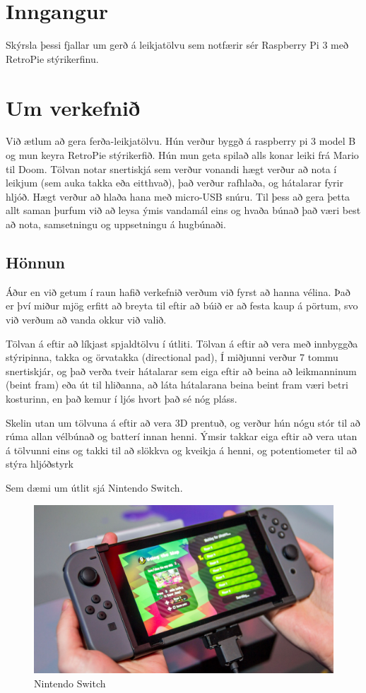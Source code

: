 \section{Inngangur}
Skýrsla þessi fjallar um gerð á leikjatölvu sem notfærir sér Raspberry Pi 3 með RetroPie stýrikerfinu.

\section{Um verkefnið}
Við ætlum að gera ferða-leikjatölvu. Hún verður byggð á raspberry pi 3 model B og mun keyra RetroPie stýrikerfið. Hún mun geta spilað alls konar leiki frá Mario til Doom. Tölvan notar snertiskjá sem verður vonandi hægt verður að nota í leikjum (sem auka takka eða eitthvað), það verður rafhlaða, og hátalarar fyrir hljóð. Hægt verður að hlaða hana með micro-USB snúru. Til þess að gera þetta allt saman þurfum við að leysa ýmis vandamál eins og hvaða búnað það væri best að nota, samsetningu og uppsetningu á hugbúnaði.

\subsection{Hönnun}

Áður en við getum í raun hafið verkefnið verðum við fyrst að hanna vélina. Það er því miður mjög erfitt að breyta til eftir að búið er að festa kaup á pörtum, svo við verðum að vanda okkur við valið.

Tölvan á eftir að líkjast spjaldtölvu í útliti. Tölvan á eftir að vera með innbyggða stýripinna, takka og örvatakka (directional pad), Í miðjunni verður 7 tommu snertiskjár, og það verða tveir hátalarar sem eiga eftir að beina að leikmanninum (beint fram) eða út til hliðanna, að láta hátalarana beina beint fram væri betri kosturinn, en það kemur í ljós hvort það sé nóg pláss.

Skelin utan um tölvuna á eftir að vera 3D prentuð, og verður hún nógu stór til að rúma allan vélbúnað og batterí innan henni. Ýmsir takkar eiga eftir að vera utan á tölvunni eins og takki til að slökkva og kveikja á henni, og potentiometer til að stýra hljóðstyrk

Sem dæmi um útlit sjá Nintendo Switch.

\begin{figure}[h]
	\centering
	\includegraphics[scale=.5]{img/switch}
	\caption{Nintendo Switch}
\end{figure}

